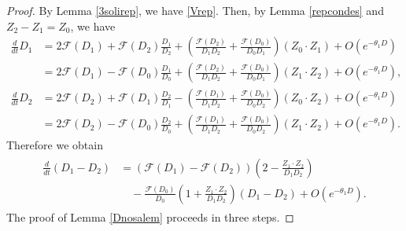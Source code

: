 \documentclass[reqno]{amsart}
\theoremstyle{plain}
\theoremstyle{definition}
\numberwithin{equation}{section}
\newcommand{\1}{\mathbbm{1}}
\begin{document}
\begin{proof}
By Lemma \ref{3solirep}, we have \eqref{Vrep}. Then, by Lemma \ref{repcondes} and $Z_2-Z_1=Z_0$, we have
\begin{align*}
\frac{d}{dt}D_1&=2\mathcal{F}(D_1)+\mathcal{F}(D_2)\frac{D_1}{D_2}+\left( \frac{\mathcal{F}(D_2)}{D_1D_2}+\frac{\mathcal{F}(D_0)}{D_0D_1}\right)(Z_0\cdot Z_1)+O(e^{-\theta_1D})
\\
&=2\mathcal{F}(D_1)-\mathcal{F}(D_0)\frac{D_1}{D_0}+\left(\frac{\mathcal{F}(D_2)}{D_1D_2}+\frac{\mathcal{F}(D_0)}{D_0D_1}\right)(Z_1\cdot Z_2)+O(e^{-\theta_1 D}),
\\
\frac{d}{dt}D_2&=2\mathcal{F}(D_2)+\mathcal{F}(D_1)\frac{D_2}{D_1}-\left(\frac{\mathcal{F}(D_1)}{D_1D_2}+\frac{\mathcal{F}(D_0)}{D_0D_2}\right)(Z_0\cdot Z_2)+O(e^{-\theta_1 D})
\\
&=2\mathcal{F}(D_2)-\mathcal{F}(D_0)\frac{D_2}{D_0}+\left(\frac{\mathcal{F}(D_1)}{D_1D_2}+\frac{\mathcal{F}(D_0)}{D_0D_2}\right)(Z_1\cdot Z_2)+O(e^{-\theta_1 D}).
\end{align*}
Therefore we obtain
\begin{align}\label{d1d2saes}
\begin{aligned}
\frac{d}{dt}(D_1-D_2)&=\left( \mathcal{F}(D_1)-\mathcal{F}(D_2)\right)\left(2-\frac{Z_1\cdot Z_2}{D_1D_2}\right)
\\
&\quad -\frac{\mathcal{F}(D_0)}{D_0}\left(1+\frac{Z_1\cdot Z_2}{D_1D_2}\right)(D_1-D_2)+O(e^{-\theta_1 D}).
\end{aligned}
\end{align}
The proof of Lemma \ref{Dnosalem} proceeds in three steps.


\end{proof}
\end{document}
